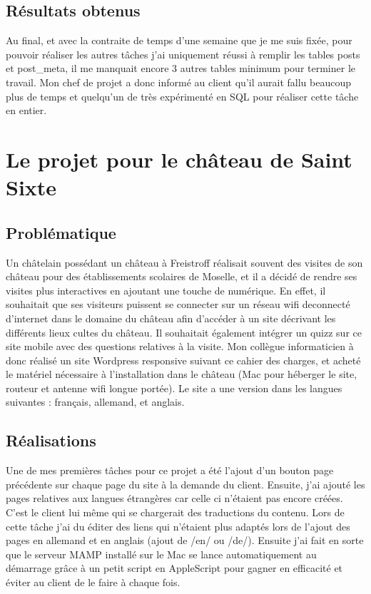 \documentclass[report]{tnreport}
\begin{document}
\section{Résultats obtenus}
Au final, et avec la contraite de temps d'une semaine que je me suis fixée, pour pouvoir réaliser les autres tâches j'ai uniquement réussi à remplir les tables posts et post\_meta, il me manquait encore 3 autres tables minimum pour terminer le travail. Mon chef de projet a donc informé au client qu’il aurait fallu beaucoup plus de temps et quelqu’un de très expérimenté en SQL pour réaliser cette tâche en entier.

\chapter{Le projet pour le château de Saint Sixte}

\section{Problématique}
Un châtelain possédant un château à Freistroff réalisait souvent des visites de son château pour des établissements scolaires de Moselle, et il a décidé de rendre ses visites plus interactives en ajoutant une touche de numérique. En effet, il souhaitait que ses visiteurs puissent se connecter sur un réseau wifi deconnecté d'internet dans le domaine du château afin d’accéder à un site décrivant les différents lieux cultes du château. Il souhaitait également intégrer un quizz sur ce site mobile avec des questions relatives à la visite. Mon collègue informaticien à donc réalisé un site Wordpress responsive suivant ce cahier des charges, et acheté le matériel nécessaire à l’installation dans le château (Mac pour héberger le site, routeur et antenne wifi longue portée). Le site a une version dans les langues suivantes : français, allemand, et anglais.

\section{Réalisations}

Une de mes premières tâches pour ce projet a été l’ajout d’un bouton page précédente sur chaque page du site à la demande du client. Ensuite, j’ai ajouté les pages relatives aux langues étrangères car celle ci n’étaient pas encore créées. C’est le client lui même qui se chargerait des traductions du contenu. Lors de cette tâche j’ai du éditer des liens qui n’étaient plus adaptés lors de l’ajout des pages en allemand et en anglais (ajout de /en/ ou /de/). Ensuite j’ai fait en sorte que le serveur MAMP installé sur le Mac se lance automatiquement au démarrage grâce à un petit script en AppleScript pour gagner en efficacité et éviter au client de le faire à chaque fois.
\end{document}
